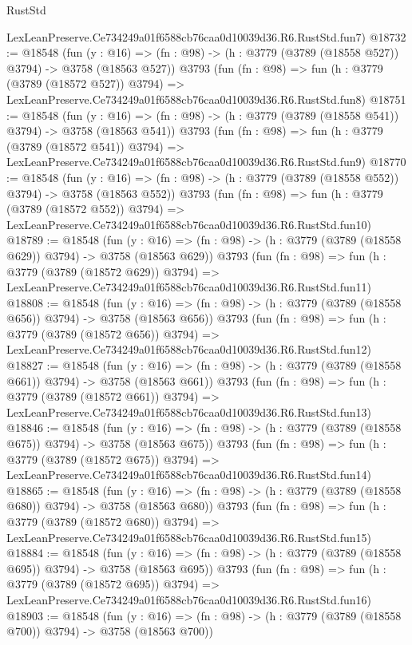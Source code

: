 \begin{lexlean}{RustStd}
\begin{coremodule}
    LexLeanPreserve.Ce734249a01f6588cb76caa0d10039d36.R6.RustStd.fun7)
@18732 := @18548
    (fun (y : @16) => (fn : @98) -> (h : @3779 (@3789 (@18558 @527)) @3794) -> @3758 (@18563 @527))
    @3793
    (fun (fn : @98) =>
    fun (h : @3779 (@3789 (@18572 @527)) @3794) =>
    LexLeanPreserve.Ce734249a01f6588cb76caa0d10039d36.R6.RustStd.fun8)
@18751 := @18548
    (fun (y : @16) => (fn : @98) -> (h : @3779 (@3789 (@18558 @541)) @3794) -> @3758 (@18563 @541))
    @3793
    (fun (fn : @98) =>
    fun (h : @3779 (@3789 (@18572 @541)) @3794) =>
    LexLeanPreserve.Ce734249a01f6588cb76caa0d10039d36.R6.RustStd.fun9)
@18770 := @18548
    (fun (y : @16) => (fn : @98) -> (h : @3779 (@3789 (@18558 @552)) @3794) -> @3758 (@18563 @552))
    @3793
    (fun (fn : @98) =>
    fun (h : @3779 (@3789 (@18572 @552)) @3794) =>
    LexLeanPreserve.Ce734249a01f6588cb76caa0d10039d36.R6.RustStd.fun10)
@18789 := @18548
    (fun (y : @16) => (fn : @98) -> (h : @3779 (@3789 (@18558 @629)) @3794) -> @3758 (@18563 @629))
    @3793
    (fun (fn : @98) =>
    fun (h : @3779 (@3789 (@18572 @629)) @3794) =>
    LexLeanPreserve.Ce734249a01f6588cb76caa0d10039d36.R6.RustStd.fun11)
@18808 := @18548
    (fun (y : @16) => (fn : @98) -> (h : @3779 (@3789 (@18558 @656)) @3794) -> @3758 (@18563 @656))
    @3793
    (fun (fn : @98) =>
    fun (h : @3779 (@3789 (@18572 @656)) @3794) =>
    LexLeanPreserve.Ce734249a01f6588cb76caa0d10039d36.R6.RustStd.fun12)
@18827 := @18548
    (fun (y : @16) => (fn : @98) -> (h : @3779 (@3789 (@18558 @661)) @3794) -> @3758 (@18563 @661))
    @3793
    (fun (fn : @98) =>
    fun (h : @3779 (@3789 (@18572 @661)) @3794) =>
    LexLeanPreserve.Ce734249a01f6588cb76caa0d10039d36.R6.RustStd.fun13)
@18846 := @18548
    (fun (y : @16) => (fn : @98) -> (h : @3779 (@3789 (@18558 @675)) @3794) -> @3758 (@18563 @675))
    @3793
    (fun (fn : @98) =>
    fun (h : @3779 (@3789 (@18572 @675)) @3794) =>
    LexLeanPreserve.Ce734249a01f6588cb76caa0d10039d36.R6.RustStd.fun14)
@18865 := @18548
    (fun (y : @16) => (fn : @98) -> (h : @3779 (@3789 (@18558 @680)) @3794) -> @3758 (@18563 @680))
    @3793
    (fun (fn : @98) =>
    fun (h : @3779 (@3789 (@18572 @680)) @3794) =>
    LexLeanPreserve.Ce734249a01f6588cb76caa0d10039d36.R6.RustStd.fun15)
@18884 := @18548
    (fun (y : @16) => (fn : @98) -> (h : @3779 (@3789 (@18558 @695)) @3794) -> @3758 (@18563 @695))
    @3793
    (fun (fn : @98) =>
    fun (h : @3779 (@3789 (@18572 @695)) @3794) =>
    LexLeanPreserve.Ce734249a01f6588cb76caa0d10039d36.R6.RustStd.fun16)
@18903 := @18548
    (fun (y : @16) => (fn : @98) -> (h : @3779 (@3789 (@18558 @700)) @3794) -> @3758 (@18563 @700))

\end{coremodule}
\end{lexlean}
